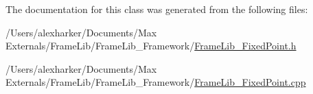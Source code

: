 The documentation for this class was generated from the following files\+:\begin{DoxyCompactItemize}
\item 
/\+Users/alexharker/\+Documents/\+Max Externals/\+Frame\+Lib/\+Frame\+Lib\+\_\+\+Framework/\hyperlink{_frame_lib___fixed_point_8h}{Frame\+Lib\+\_\+\+Fixed\+Point.\+h}\item 
/\+Users/alexharker/\+Documents/\+Max Externals/\+Frame\+Lib/\+Frame\+Lib\+\_\+\+Framework/\hyperlink{_frame_lib___fixed_point_8cpp}{Frame\+Lib\+\_\+\+Fixed\+Point.\+cpp}\end{DoxyCompactItemize}
